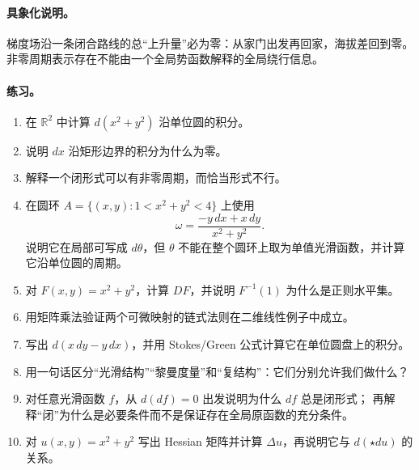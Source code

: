 \documentclass[UTF8,fontset=none,a4paper,11pt]{ctexart}
\theoremstyle{foundation-definition}
\theoremstyle{foundation-theorem}
\theoremstyle{foundation-proposition}
\theoremstyle{foundation-example}
\theoremstyle{foundation-remark}
\theoremstyle{foundation-theorem}
\begin{document}
\paragraph{具象化说明。}
梯度场沿一条闭合路线的总“上升量”必为零：从家门出发再回家，海拔差回到零。非零周期表示存在不能由一个全局势函数解释的全局绕行信息。

\paragraph{练习。}
\begin{enumerate}[label=M5B.\arabic*.]
  \item 在 \(\mathbb R^2\) 中计算 \(d(x^2+y^2)\) 沿单位圆的积分。
  \item 说明 \(dx\) 沿矩形边界的积分为什么为零。
  \item 解释一个闭形式可以有非零周期，而恰当形式不行。
  \item 在圆环 \(A=\{(x,y):1< x^2+y^2<4\}\) 上使用
  \[
  \omega=\frac{-y\,dx+x\,dy}{x^2+y^2}.
  \]
  说明它在局部可写成 \(d\theta\)，但 \(\theta\) 不能在整个圆环上取为单值光滑函数，并计算它沿单位圆的周期。
  \item 对 \(F(x,y)=x^2+y^2\)，计算 \(DF\)，并说明 \(F^{-1}(1)\) 为什么是正则水平集。
  \item 用矩阵乘法验证两个可微映射的链式法则在二维线性例子中成立。
  \item 写出 \(d(x\,dy-y\,dx)\)，并用 Stokes/Green 公式计算它在单位圆盘上的积分。
  \item 用一句话区分“光滑结构”“黎曼度量”和“复结构”：它们分别允许我们做什么？
  \item 对任意光滑函数 \(f\)，从 \(d(df)=0\) 出发说明为什么 \(df\) 总是闭形式；
    再解释“闭”为什么是必要条件而不是保证存在全局原函数的充分条件。
  \item 对 \(u(x,y)=x^2+y^2\) 写出 Hessian 矩阵并计算 \(\Delta u\)，再说明它与
    \(d(\star du)\) 的关系。
\end{enumerate}
\end{document}
